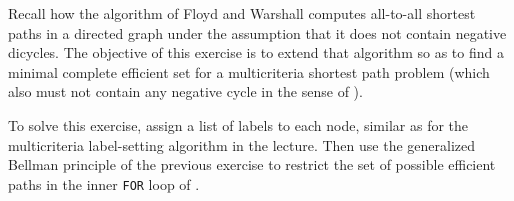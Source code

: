 \documentclass[11pt,english,a4paper,parskip=half-]{scrartcl}
\begin{document}
\begin{exercise}{}
Recall how the algorithm of Floyd and Warshall computes all-to-all shortest paths in a directed graph under the assumption that it does not contain negative dicycles. The objective of this exercise is to extend that algorithm so as to find a minimal complete efficient set for a multicriteria shortest path problem (which also must not contain any negative cycle in the sense of ).

To solve this exercise, assign a list of labels to each node, similar as for the multicriteria label-setting algorithm in the lecture. Then use the generalized Bellman principle of the previous exercise to restrict the set of possible efficient paths in the inner \texttt{FOR} loop of . 
\end{exercise}
\end{document}
